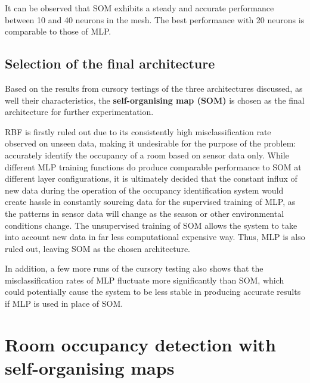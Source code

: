 \documentclass[10pt, oneside]{article}
\begin{document}
It can be observed that SOM exhibits a steady and accurate performance between 10 and 40 neurons in the mesh. The best performance with 20 neurons is comparable to those of MLP.

\subsection{Selection of the final architecture}

Based on the results from cursory testings of the three architectures discussed, as well their characteristics, the \textbf{self-organising map (SOM)} is chosen as the final architecture for further experimentation. 

RBF is firstly ruled out due to its consistently high misclassification rate observed on unseen data, making it undesirable for the purpose of the problem: accurately identify the occupancy of a room based on sensor data only. While different MLP training functions do produce comparable performance to SOM at different layer configurations, it is ultimately decided that the constant influx of new data during the operation of the occupancy identification system would create hassle in constantly sourcing data for the supervised training of MLP, as the patterns in sensor data will change as the season or other environmental conditions change. The unsupervised training of SOM allows the system to take into account new data in far less computational expensive way. Thus, MLP is also ruled out, leaving SOM as the chosen architecture.

In addition, a few more runs of the cursory testing also shows that the misclassification rates of MLP fluctuate more significantly than SOM, which could potentially cause the system to be less stable in producing accurate results if MLP is used in place of SOM. 

\section{Room occupancy detection with self-organising maps}




\small{}
\end{document}

